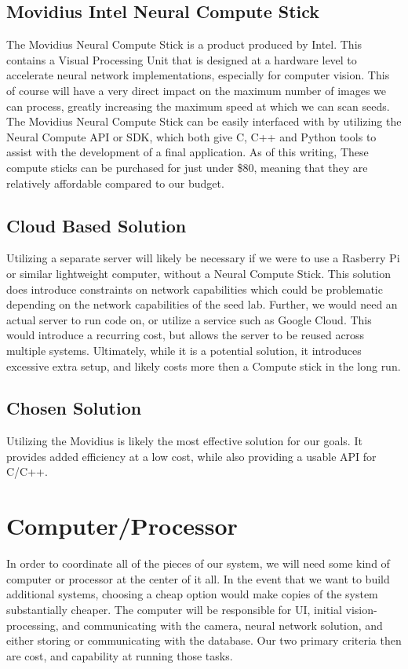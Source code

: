 \documentclass[onecolumn, draftclsnofoot,10pt, compsoc]{IEEEtran}
\begin{document}
\subsection{Movidius Intel Neural Compute Stick}
The Movidius Neural Compute Stick is a product produced by Intel. This contains a Visual Processing Unit that is designed at a hardware level to accelerate neural network implementations, especially for computer vision. \cite{intel} This of course will have a very direct impact on the maximum number of images we can process, greatly increasing the maximum speed at which we can scan seeds. The Movidius Neural Compute Stick can be easily interfaced with by utilizing the Neural Compute API or SDK, which both give C, C++ and Python tools to assist with the development of a final application. \cite{intelintro} As of this writing, These compute sticks can be purchased for just under \$80, meaning that they are relatively affordable compared to our budget.

\subsection{Cloud Based Solution}
Utilizing a separate server will likely be necessary if we were to use a Rasberry Pi or similar lightweight computer, without a Neural Compute Stick. This solution does introduce constraints on network capabilities which could be problematic depending on the network capabilities of the seed lab. Further, we would need an actual server to run code on, or utilize a  service such as Google Cloud. This would introduce a recurring cost, but allows the server to be reused across multiple systems. Ultimately, while it is a potential solution, it introduces excessive extra setup, and likely costs more then a Compute stick in the long run.
\subsection{Chosen Solution}
Utilizing the Movidius is likely the most effective solution for our goals. It provides added efficiency at a low cost, while also providing a usable API for C/C++.

\section{Computer/Processor}
In order to coordinate all of the pieces of our system, we will need some kind of computer or processor at the center of it all. In the event that we want to build additional systems, choosing a cheap option would make copies of the system substantially cheaper. The computer will be responsible for UI, initial vision-processing, and communicating with the camera, neural network solution, and either storing or communicating with the database. Our two primary criteria then are cost, and capability at running those tasks.
\end{document}
